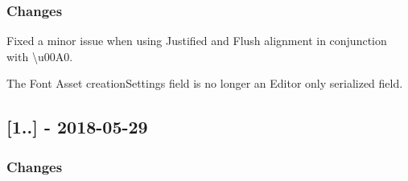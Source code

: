 \subsubsection*{Changes}


\begin{DoxyItemize}
\item Fixed a minor issue when using Justified and Flush alignment in conjunction with \textbackslash{}u00\+A0.
\item The Font Asset creation\+Settings field is no longer an Editor only serialized field.
\end{DoxyItemize}

\subsection*{\mbox{[}1..\mbox{]} -\/ 2018-\/05-\/29}

\subsubsection*{Changes}


